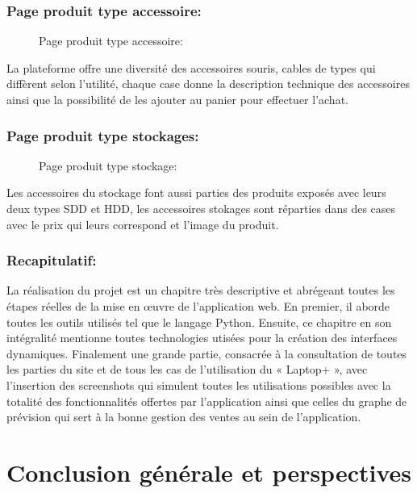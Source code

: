 \documentclass[a4paper]{report}
\begin{document}
\begin{doublespace}
	\subsection{Page produit type accessoire:}
	\begin{figure}[H]
		\begin{center}
			\caption{Page produit type accessoire:}
		\end{center}
	\end{figure}

	La plateforme offre une diversité des accessoires
	souris, cables de types qui diffèrent selon l'utilité, chaque case donne la
	description technique des accessoires ainsi que la possibilité de les ajouter
	au panier pour effectuer l'achat.

	\subsection{Page produit type stockages:}
	\begin{figure}[H]
		\begin{center}
			\caption{Page produit type stockage:}
		\end{center}
	\end{figure}

	Les accessoires du stockage font aussi parties des
	produits exposés avec leurs deux types SDD et HDD, les accessoires stokages
	sont réparties dans des cases avec le prix qui leurs correspond et l'image du
	produit.
	\subsection{Recapitulatif:}
	La réalisation du projet est un chapitre très
	descriptive et abrégeant toutes les étapes réelles de la mise en œuvre de
	l'application web. En premier, il aborde toutes les outils utilisés tel que le
	langage  Python. Ensuite, ce chapitre en son intégralité mentionne toutes
	technologies utisées pour la création des interfaces dynamiques. Finalement une
	grande partie, consacrée à la consultation de toutes les parties du site et de
	tous les cas de l’utilisation du « Laptop+ », avec l’insertion des screenshots
	qui simulent toutes les utilisations possibles avec la totalité des
	fonctionnalités offertes par l'application ainsi que celles du graphe de
	prévision qui sert à la bonne gestion des ventes au sein de l'application.
	\chapter{Conclusion générale et perspectives}
	\fancyhead[L]{\hspace*{5cm}}

\end{doublespace}
\end{document}
